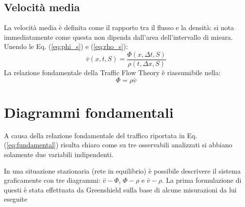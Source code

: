 \documentclass[../main.tex]{subfiles}
\begin{document}
\subsection{Velocit\`a media}
La velocit\`a media \`e definita come il rapporto tra il flusso e la densit\`a: si nota immediatamente come questa non dipenda dall'area dell'intervallo di misura.
Unendo le Eq. (\ref{eq:phi_s}) e (\ref{eq:rho_s}):
\begin{equation}
    \bar{v}(x, t, S)=\frac{\Phi(x, \Delta t, S)}{\rho(t,\Delta x, S)}
\end{equation}
La relazione fondamentale della Traffic Flow Theory \cite{H111} \`e riassumibile nella:
\begin{equation}
    \Phi=\rho\bar{v}
    \label{eq:fundamental}
\end{equation}

\section{Diagrammi fondamentali}
A causa della relazione fondamentale del traffico riportata in Eq. (\ref{eq:fundamental}) risulta chiaro come su tre osservabili analizzati si abbiano solamente due variabili indipendenti.
\hspace{1cm}
In una situazione stazionaria (rete in equilibrio) \`e possibile descrivere il sistema graficamente con tre diagrammi: $\bar{v}-\Phi$, $\Phi-\rho$ e $\bar{v}-\rho$.
La prima formulazione di questi \`e stata effettuata da Greenshield sulla base di alcune misurazioni da lui eseguite
\end{document}
